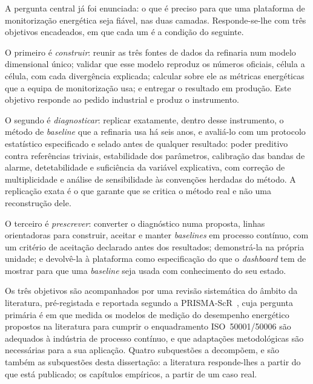 A pergunta central já foi enunciada: o que é preciso para que uma
plataforma de monitorização energética seja fiável, nas duas camadas.
Responde-se-lhe com três objetivos encadeados, em que cada um é a
condição do seguinte.

O primeiro é \emph{construir}: reunir as três fontes de dados da
refinaria num modelo dimensional único; validar que esse modelo
reproduz os números oficiais, célula a célula, com cada divergência
explicada; calcular sobre ele as métricas energéticas que a equipa de
monitorização usa; e entregar o resultado em produção. Este objetivo
responde ao pedido industrial e produz o instrumento.

O segundo é \emph{diagnosticar}: replicar exatamente, dentro desse
instrumento, o método de \emph{baseline} que a refinaria usa há seis
anos, e avaliá-lo com um protocolo estatístico especificado e selado
antes de qualquer resultado: poder preditivo contra referências
triviais, estabilidade dos parâmetros, calibração das bandas de alarme,
detetabilidade e suficiência da variável explicativa, com correção de
multiplicidade e análise de sensibilidade às convenções herdadas do
método. A replicação exata é o que garante que se critica o método real
e não uma reconstrução dele.

O terceiro é \emph{prescrever}: converter o diagnóstico numa proposta,
linhas orientadoras para construir, aceitar e manter \emph{baselines}
em processo contínuo, com um critério de aceitação declarado antes dos
resultados; demonstrá-la na própria unidade; e devolvê-la à plataforma como especificação do que o \emph{dashboard}
tem de mostrar para que uma \emph{baseline} seja usada com conhecimento
do seu estado.

Os três objetivos são acompanhados por uma revisão sistemática do
âmbito da literatura, pré-registada e reportada segundo a
PRISMA-ScR~\cite{Tricco2018}, cuja pergunta primária
é em que medida os modelos de medição do desempenho energético
propostos na literatura para cumprir o enquadramento ISO~50001/50006
são adequados à indústria de processo contínuo, e que adaptações
metodológicas são necessárias para a sua aplicação. Quatro subquestões
a decompõem, e são também as subquestões desta dissertação: a
literatura responde-lhes a partir do que está publicado; os capítulos
empíricos, a partir de um caso real.

